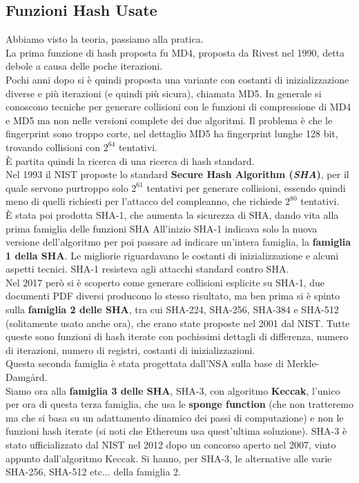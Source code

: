\documentclass[a4paper,12pt, oneside]{book}
\begin{document}
\subsection{Funzioni Hash Usate}
Abbiamo visto la teoria, passiamo alla pratica.\\
La prima funzione di hash proposta fu MD4, proposta da Rivest nel 1990, detta
debole a causa delle poche iterazioni.\\
Pochi anni dopo si è quindi proposta una variante con costanti di
inizializzazione diverse e più iterazioni (e quindi più sicura), chiamata
MD5. In generale si conoscono tecniche per generare collisioni con le funzioni
di compressione di MD4 e MD5 ma non nelle versioni complete dei due
algoritmi. Il problema è che le fingerprint sono troppo corte, nel dettaglio MD5
ha fingerprint lunghe 128 bit, trovando collisioni con $2^{64}$ tentativi.\\
È partita quindi la ricerca di una ricerca di hash standard.\\
Nel 1993 il NIST proposte lo standard \textbf{Secure Hash Algorithm
  (\textit{SHA})}, per il quale servono purtroppo solo $2^{61}$ tentativi per
generare collisioni, essendo quindi meno di quelli richiesti per l'attacco del
compleanno, che richiede $2^{80}$ tentativi. \\
È stata poi prodotta SHA-1, che aumenta la sicurezza di SHA, dando vita alla
prima famiglia delle funzioni SHA All'inizio SHA-1 indicava solo la nuova
versione dell'algoritmo per poi passare ad indicare un'intera famiglia, la
\textbf{famiglia 1 della SHA}. Le migliorie riguardavano le costanti di
inizializzazione e alcuni aspetti tecnici. SHA-1 resisteva agli attacchi
standard contro SHA.\\
Nel 2017 però si è scoperto come generare collisioni esplicite su SHA-1, due
documenti PDF diversi producono lo stesso risultato, ma ben prima si è
spinto sulla \textbf{famiglia 2 delle SHA}, tra cui SHA-224, SHA-256, SHA-384 e
SHA-512 (solitamente usato anche ora), che erano state proposte nel 2001 dal
NIST. Tutte queste sono funzioni di hash iterate con pochissimi dettagli di
differenza, numero di iterazioni, numero di registri, costanti di
inizializzazioni.\\
Questa seconda famiglia è stata progettata dall'NSA sulla base di
Merkle-Damg{\aa}rd. \\
Siamo ora alla \textbf{famiglia 3 delle SHA}, SHA-3, con algoritmo
\textbf{Keccak}, l'unico per ora di questa terza famiglia, che usa le
\textbf{sponge function} (che non tratteremo ma che si basa su un adattamento
dinamico dei passi di computazione) e non 
le funzioni hash iterate (si noti che Ethereum usa quest'ultima
soluzione). SHA-3 è stato ufficializzato dal NIST nel 2012 dopo un concorso
aperto nel 2007, vinto appunto dall'algoritmo Keccak. Si hanno, per SHA-3, le
alternative alle varie SHA-256, SHA-512 etc$\ldots$ della famiglia 2.
\end{document}
